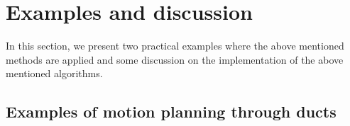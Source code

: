 \documentclass[12pt,a4]{article}
\begin{document}
%

%

\section{Examples and discussion}
In this section, we present two practical examples where the above mentioned methods are applied and some discussion on the implementation of the above mentioned algorithms.
\subsection{Examples of motion planning through ducts}
\end{document}
